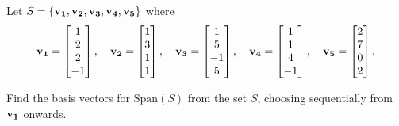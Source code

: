 \question

Let $S = \{\bm{\mathrm{v_1}}, \bm{\mathrm{v_2}}, \bm{\mathrm{v_3}}, \bm{\mathrm{v_4}}, \bm{\mathrm{v_5}}\}$ where
\[
    \bm{\mathrm{v_1}} = \begin{bmatrix} 1 \\ 2 \\ 2 \\ -1 \end{bmatrix}, \quad
    \bm{\mathrm{v_2}} = \begin{bmatrix} 1 \\ 3 \\ 1 \\ 1 \end{bmatrix}, \quad
    \bm{\mathrm{v_3}} = \begin{bmatrix} 1 \\ 5 \\ -1 \\ 5 \end{bmatrix}, \quad
    \bm{\mathrm{v_4}} = \begin{bmatrix} 1 \\ 1 \\ 4 \\ -1 \end{bmatrix}, \quad
    \bm{\mathrm{v_5}} = \begin{bmatrix} 2 \\ 7 \\ 0 \\ 2 \end{bmatrix}.
\]

Find the basis vectors for $\text{Span}(S)$ from the set $S$, choosing sequentially from
$\bm{\mathrm{v_1}}$ onwards.

